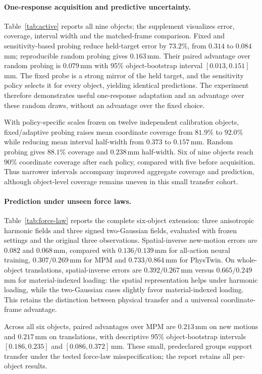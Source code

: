 \paragraph{One-response acquisition and predictive uncertainty.}
Table~\ref{tab:active} reports all nine objects; the supplement visualizes error, coverage, interval width and the matched-frame comparison. Fixed and sensitivity-based probing reduce held-target error by $73.2\%$, from $0.314$ to $0.084$\,mm; reproducible random probing gives $0.163$\,mm. Their paired advantage over random probing is $0.079$\,mm with 95\% object-bootstrap interval $[0.013,0.151]$\,mm. The fixed probe is a strong mirror of the held target, and the sensitivity policy selects it for every object, yielding identical predictions. The experiment therefore demonstrates useful one-response adaptation and an advantage over these random draws, without an advantage over the fixed choice.

With policy-specific scales frozen on twelve independent calibration objects, fixed/adaptive probing raises mean coordinate coverage from $81.9\%$ to $92.0\%$ while reducing mean interval half-width from $0.373$ to $0.157$\,mm. Random probing gives $88.1\%$ coverage and $0.238$\,mm half-width. Six of nine objects reach $90\%$ coordinate coverage after each policy, compared with five before acquisition. Thus narrower intervals accompany improved aggregate coverage and prediction, although object-level coverage remains uneven in this small transfer cohort.

\paragraph{Prediction under unseen force laws.}
Table~\ref{tab:force-law} reports the complete six-object extension: three anisotropic harmonic fields and three signed two-Gaussian fields, evaluated with frozen settings and the original three observations. Spatial-inverse new-motion errors are $0.082$ and $0.068$\,mm, compared with $0.136/0.139$\,mm for all-action neural training, $0.307/0.269$\,mm for MPM and $0.733/0.864$\,mm for PhysTwin. On whole-object translations, spatial-inverse errors are $0.392/0.267$\,mm versus $0.665/0.249$\,mm for material-indexed loading: the spatial representation helps under harmonic loading, while the two-Gaussian cases slightly favor material-indexed loading. This retains the distinction between physical transfer and a universal coordinate-frame advantage.

Across all six objects, paired advantages over MPM are $0.213$\,mm on new motions and $0.217$\,mm on translations, with descriptive 95\% object-bootstrap intervals $[0.186,0.235]$ and $[0.086,0.372]$\,mm. These small, predeclared groups support transfer under the tested force-law misspecification; the report retains all per-object results.
